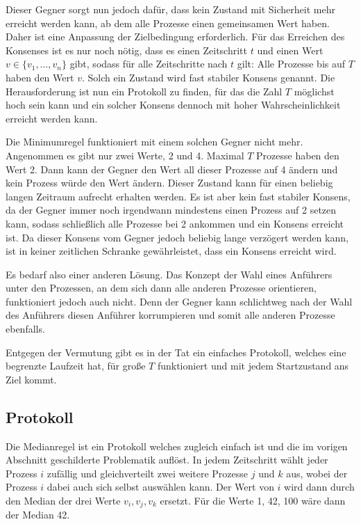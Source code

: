 \documentclass[12pt,ngerman,a4paper]{scrartcl}
\theoremstyle{plain}
\theoremstyle{definition}
\theoremstyle{remark}
\begin{document}
Dieser Gegner sorgt nun jedoch dafür, dass kein Zustand mit Sicherheit mehr
erreicht werden kann, ab dem alle Prozesse einen gemeinsamen Wert haben. Daher
ist eine Anpassung der Zielbedingung erforderlich. Für das Erreichen des Konsenses
ist es nur noch nötig, dass es einen Zeitschritt $t$ und einen Wert
$v \in \{v_1,...,v_n\}$ gibt, sodass für alle Zeitschritte nach $t$ gilt: Alle
Prozesse bis auf $T$ haben den Wert $v$. Solch ein Zustand wird fast stabiler
Konsens genannt. Die Herausforderung ist nun ein Protokoll zu finden, für das
die Zahl $T$ möglichst hoch sein kann und ein solcher Konsens dennoch mit hoher
Wahrscheinlichkeit erreicht werden kann.

Die Minimumregel funktioniert mit einem solchen Gegner nicht mehr. Angenommen
es gibt nur zwei Werte, 2 und 4. Maximal $T$ Prozesse haben den Wert 2. Dann kann
der Gegner den Wert all dieser Prozesse auf 4 ändern und kein Prozess würde den
Wert ändern. Dieser Zustand kann für einen beliebig langen Zeitraum aufrecht
erhalten werden. Es ist aber kein fast stabiler Konsens, da der Gegner immer
noch irgendwann mindestens einen Prozess auf 2 setzen kann, sodass schließlich
alle Prozesse bei 2 ankommen und ein Konsens erreicht ist. Da dieser Konsens
vom Gegner jedoch beliebig lange verzögert werden kann, ist in keiner zeitlichen
Schranke gewährleistet, dass ein Konsens erreicht wird.

Es bedarf also einer anderen Lösung. Das Konzept der Wahl eines Anführers unter
den Prozessen, an dem sich dann alle anderen Prozesse orientieren, funktioniert
jedoch auch nicht. Denn der Gegner kann schlichtweg nach der Wahl des Anführers
diesen Anführer korrumpieren und somit alle anderen Prozesse ebenfalls.

Entgegen der Vermutung gibt es in der Tat ein einfaches Protokoll, welches eine
begrenzte Laufzeit hat, für große $T$ funktioniert und mit jedem
Startzustand ans Ziel kommt.

\subsection{Protokoll}

Die Medianregel ist ein Protokoll welches zugleich einfach ist und die im vorigen
Abschnitt geschilderte Problematik auflöst. In jedem Zeitschritt wählt jeder
Prozess $i$ zufällig und gleichverteilt zwei weitere Prozesse $j$ und $k$ aus,
wobei der Prozess $i$ dabei auch sich selbst auswählen kann. Der Wert von $i$
wird dann durch den Median der drei Werte $v_i, v_j, v_k$ ersetzt. Für die Werte
1, 42, 100 wäre dann der Median 42.
\end{document}
